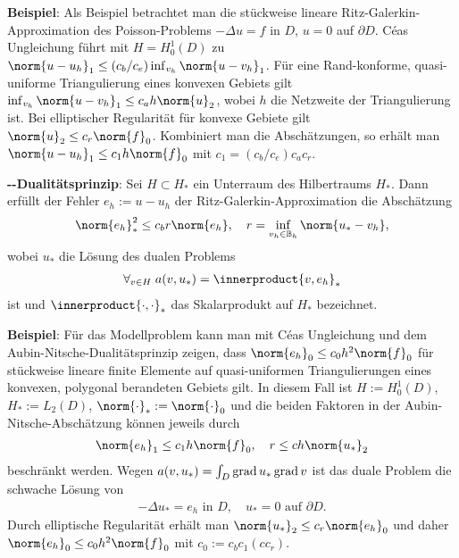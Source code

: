 \linie

\textbf{Beispiel}:
Als Beispiel betrachtet man die stückweise lineare Ritz-Galerkin-Approximation
des Poisson-Problems $-\Delta u = f$ in $D$, $u = 0$ auf $\partial D$.
Céas Ungleichung führt mit $H = H_0^1(D)$ zu
$\norm{u - u_h}_1 \le (c_b/c_e) \inf_{v_h} \norm{u - v_h}_1$.
Für eine Rand-konforme, quasi-uniforme Triangulierung eines konvexen Gebiets gilt
$\inf_{v_h} \norm{u - v_h}_1 \le c_a h \norm{u}_2$, wobei $h$ die Netzweite der Triangulierung ist.
Bei elliptischer Regularität für konvexe Gebiete gilt $\norm{u}_2 \le c_r \norm{f}_0$.
Kombiniert man die Abschätzungen, so erhält man
$\norm{u - u_h}_1 \le c_1 h \norm{f}_0$ mit $c_1 = (c_b/c_e) c_a c_r$.

\linie
\pagebreak

\textbf{--Dualitätsprinzip}:
Sei $H \subset H_\ast$ ein Unterraum des Hilbertraums $H_\ast$.
Dann erfüllt der Fehler $e_h := u - u_h$ der Ritz-Galerkin-Approximation die Abschätzung
\begin{align*}
    \norm{e_h}_\ast^2 \le c_b r \norm{e_h},\quad
    r = \inf_{v_h \in \BB_h} \norm{u_\ast - v_h},
\end{align*}
wobei $u_\ast$ die Lösung des dualen Problems
\begin{align*}
    \forall_{v \in H}\; a(v, u_\ast) = \innerproduct{v, e_h}_\ast
\end{align*}
ist und $\innerproduct{\cdot, \cdot}_\ast$ das Skalarprodukt auf $H_\ast$ bezeichnet.

\linie

\textbf{Beispiel}:
Für das Modellproblem kann man mit Céas Ungleichung und dem Aubin-Nitsche-Dualitätsprinzip zeigen,
dass $\norm{e_h}_0 \le c_0 h^2 \norm{f}_0$ für stückweise lineare finite Elemente auf
quasi-uniformen Triangulierungen eines konvexen, polygonal berandeten Gebiets gilt.
In diesem Fall ist $H := H_0^1(D)$, $H_\ast := L_2(D)$, $\norm{\cdot}_\ast := \norm{\cdot}_0$ und
die beiden Faktoren in der Aubin-Nitsche-Abschätzung können jeweils durch
\begin{align*}
    \norm{e_h}_1 \le c_1 h \norm{f}_0,\quad
    r \le ch\norm{u_\ast}_2
\end{align*}
beschränkt werden.
Wegen $a(v, u_\ast) = \int_D \operatorname{grad} u_\ast \operatorname{grad} v$ ist das duale Problem die schwache Lösung von
\begin{align*}
    -\Delta u_\ast = e_h \text{ in } D,\quad
    u_\ast = 0 \text{ auf } \partial D.
\end{align*}
Durch elliptische Regularität erhält man $\norm{u_\ast}_2 \le c_r \norm{e_h}_0$ und
daher $\norm{e_h}_0 \le c_0 h^2 \norm{f}_0$ mit $c_0 := c_b c_1 (c c_r)$.


